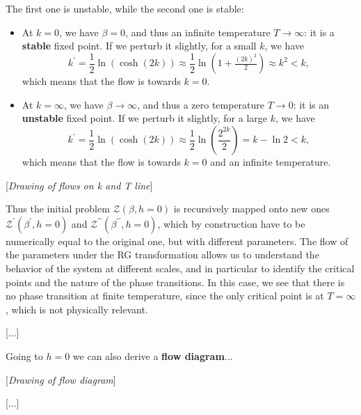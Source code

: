 The first one is unstable, while the second one is stable:
\begin{itemize}
    \item At \(k = 0\), we have \(\beta = 0\), and thus an infinite temperature \(T \to \infty\): it is a \textbf{stable} fixed point. If we perturb it slightly, for a small \(k\), we have
          \[
              k^{\prime} = \frac{1}{2} \ln \left(\cosh(2k)\right) \approx \frac{1}{2}\ln(1 + \tfrac{(2k)^2}{2}) \approx k^2 < k,
          \]
          which means that the flow is towards \(k = 0\).
    \item At \(k = \infty\), we have \(\beta \to \infty\), and thus a zero temperature \(T \to 0\): it is an \textbf{unstable} fixed point. If we perturb it slightly, for a large \(k\), we have
          \[
              k^{\prime} = \frac{1}{2} \ln \left(\cosh(2k)\right) \approx \frac{1}{2} \ln \left(\frac{2^{2k}}{2}\right) = k - \ln 2 < k,
          \]
          which means that the flow is towards \(k = 0\) and an infinite temperature.
\end{itemize}

[\textit{Drawing of flows on k and T line}]

Thus the initial problem \(\mathcal{Z}(\beta, h=0) \) is recursively mapped onto new ones \(\mathcal{Z}^{\prime}(\beta^{\prime}, h=0)\) and \(\mathcal{Z}^{\prime\prime}(\beta^{\prime\prime}, h=0)\), which by construction have to be numerically equal to the original one, but with different parameters. The flow of the parameters under the RG transformation allows us to understand the behavior of the system at different scales, and in particular to identify the critical points and the nature of the phase transitions. In this case, we see that there is no phase transition at finite temperature, since the only critical point is at \(T = \infty\), which is not physically relevant.

    [...]

Going to \(h=0\) we can also derive a \textbf{flow diagram}...

[\textit{Drawing of flow diagram}]

[...]

